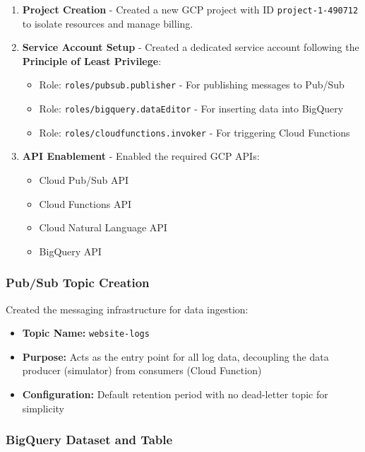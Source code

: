 \documentclass[12pt,a4paper]{article}
\begin{document}
\begin{enumerate}
    \item \textbf{Project Creation} - Created a new GCP project with ID \texttt{project-1-490712} to isolate resources and manage billing.
    
    \item \textbf{Service Account Setup} - Created a dedicated service account following the \textbf{Principle of Least Privilege}:
    \begin{itemize}
        \item Role: \texttt{roles/pubsub.publisher} - For publishing messages to Pub/Sub
        \item Role: \texttt{roles/bigquery.dataEditor} - For inserting data into BigQuery
        \item Role: \texttt{roles/cloudfunctions.invoker} - For triggering Cloud Functions
    \end{itemize}
    
    \item \textbf{API Enablement} - Enabled the required GCP APIs:
    \begin{itemize}
        \item Cloud Pub/Sub API
        \item Cloud Functions API
        \item Cloud Natural Language API
        \item BigQuery API
    \end{itemize}
\end{enumerate}

\subsubsection{Pub/Sub Topic Creation}

Created the messaging infrastructure for data ingestion:

\begin{itemize}
    \item \textbf{Topic Name:} \texttt{website-logs}
    \item \textbf{Purpose:} Acts as the entry point for all log data, decoupling the data producer (simulator) from consumers (Cloud Function)
    \item \textbf{Configuration:} Default retention period with no dead-letter topic for simplicity
\end{itemize}

\subsubsection{BigQuery Dataset and Table}
\end{document}
